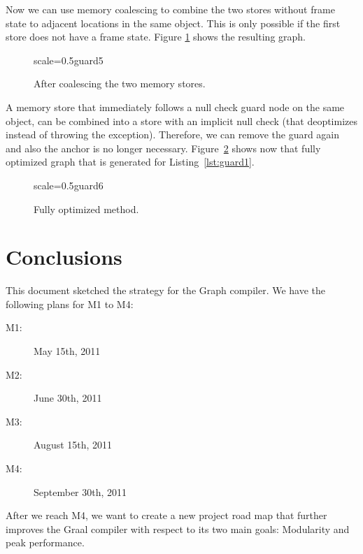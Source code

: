 \documentclass[twocolumn]{svjour3}
\begin{document}
Now we can use memory coalescing to combine the two stores without frame state to adjacent locations in the same object.
This is only possible if the first store does not have a frame state.
Figure \ref{fig:guard5} shows the resulting graph.


\begin{figure}[ht]
  \centering
\begin{digraphenv}{scale=0.5}{guard5}
\end{digraphenv}
  \caption{After coalescing the two memory stores.}
  \label{fig:guard5}
\end{figure}

A memory store that immediately follows a null check guard node on the same object, can be combined into a store with an implicit null check (that deoptimizes instead of throwing the exception).
Therefore, we can remove the guard again and also the anchor is no longer necessary.
Figure~\ref{fig:guard6} shows now that fully optimized graph that is generated for Listing~\ref{lst:guard1}.

\begin{figure}[ht]
  \centering
\begin{digraphenv}{scale=0.5}{guard6} 
\end{digraphenv}
  \caption{Fully optimized method.}
  \label{fig:guard6}
\end{figure}


\section{Conclusions}
\label{sec:conclusions}
This document sketched the strategy for the Graph compiler.
We have the following plans for M1 to M4:
\begin{description}
\item[M1:] May 15th, 2011
\item[M2:] June 30th, 2011
\item[M3:] August 15th, 2011
\item[M4:] September 30th, 2011
\end{description}
After we reach M4, we want to create a new project road map that further improves the Graal compiler with respect to its two main goals: Modularity and peak performance.
\end{document}
